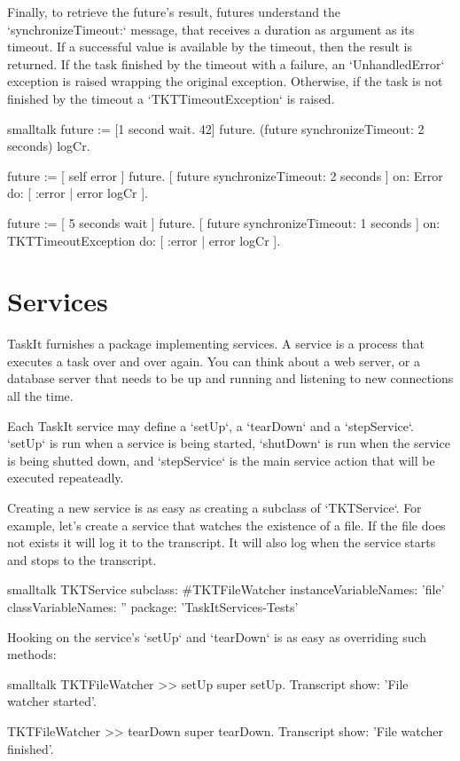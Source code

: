 \documentclass[10pt,twoside,english]{_support/latex/sbabook/sbabook}
\begin{document}
Finally, to retrieve the future's result, futures understand the `synchronizeTimeout:` message, that receives a duration as argument as its timeout. If a successful value is available by the timeout, then the result is returned. If the task finished by the timeout with a failure, an `UnhandledError` exception is raised wrapping the original exception. Otherwise, if the task is not finished by the timeout a `TKTTimeoutException` is raised.

\begin{displaycode}{smalltalk}
future := [1 second wait. 42] future.
(future synchronizeTimeout: 2 seconds) logCr.

future := [ self error ] future.
[ future synchronizeTimeout: 2 seconds ] on: Error do: [ :error | error logCr ].

future := [ 5 seconds wait ] future.
[ future synchronizeTimeout: 1 seconds ] on: TKTTimeoutException do: [ :error | error logCr ].
\end{displaycode}
\chapter{Services}
TaskIt furnishes a package implementing services. A service is a process that executes a task over and over again. You can think about a web server, or a database server that needs to be up and running and listening to new connections all the time.

Each TaskIt service may define a `setUp`, a `tearDown` and a `stepService`. `setUp` is run when a service is being started, `shutDown` is run when the service is being shutted down, and `stepService` is the main service action that will be executed repeateadly.

Creating a new service is as easy as creating a subclass of `TKTService`. For example, let's create a service that watches the existence of a file. If the file does not exists it will log it to the transcript. It will also log when the service starts and stops to the transcript.

\begin{displaycode}{smalltalk}
TKTService subclass: #TKTFileWatcher
  instanceVariableNames: 'file'
  classVariableNames: ''
  package: 'TaskItServices-Tests'
\end{displaycode}

Hooking on the service's `setUp` and `tearDown` is as easy as overriding such methods:

\begin{displaycode}{smalltalk}
TKTFileWatcher >> setUp
  super setUp.
  Transcript show: 'File watcher started'.

TKTFileWatcher >> tearDown
  super tearDown.
  Transcript show: 'File watcher finished'.
\end{displaycode}
\end{document}

